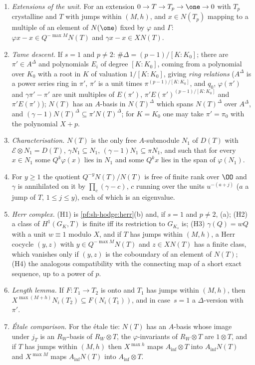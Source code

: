 \begin{enumerate}
  $\shhodgecl(y,z)\in\shhodgeHf(G_{K_s},T)$.
\item[(P8)] \emph{Extensions of the unit.} For an extension $0\to T\to T_p\to\one\to0$ with $T_p$ crystalline and $T$ with jumps within $(M,h)$,
  and $x\in N(T_p)$ mapping to a multiple of an element of $N(\one)$ fixed by $\varphi$ and $\Gamma$: $\varphi x-x\in Q^{-\max M}N(T)$ and
  $\gamma x-x\in XN(T)$.
\item[(P9)] \emph{Tame descent.} If $s=1$ and $p\ne2$: $\#\Delta=(p-1)/[K:K_0]$; there are $\pi'\in A^\Delta$ and polynomials $E_i$ of degree
  $[K:K_0]$, coming from a polynomial over $K_0$ with a root in $K$ of valuation $1/[K:K_0]$, giving \emph{ring relations} ($A^\Delta$ is a
  power series ring in $\pi'$, $\pi'$ is a unit times $\pi^{(p-1)/[K:K_0]}$, and $q_0$, $\varphi(\pi')$ and $\gamma\pi'-\pi'$ are unit multiples of
  $E(\pi')$, $\pi'E(\pi')^{(p-1)/[K:K_0]}$ and $\pi'E(\pi')$); $N(T)$ has an $A$-basis in $N(T)^\Delta$ which spans $N(T)^\Delta$ over $A^\Delta$,
  and $(\gamma-1)N(T)^\Delta\subseteq\pi'N(T)^\Delta$; for $K=K_0$ one may take $\pi'=\pi_0$ with the polynomial $X+p$.
\item[(P10)] \emph{Characterisation.} $N(T)$ is the only free $A$-submodule $N_1$ of $D(T)$ with $\mathcal E\otimes N_1=D(T)$,
  $\gamma N_1\subseteq N_1$, $(\gamma-1)N_1\subseteq\pi N_1$, and such that for every $x\in N_1$ some $Q^k\varphi(x)$ lies in $N_1$ and some
  $Q^kx$ lies in the span of $\varphi(N_1)$.
\item[($\Gamma$ss)] For $y\ge1$ the quotient $Q^{-y}N(T)/N(T)$ is free of finite rank over $\OO$ and $\gamma$ is annihilated on it by
  $\prod_c(\gamma-c)$, $c$ running over the units $u^{-(a+j)}$ ($a$ a jump of $T$, $1\le j\le y$), each of which is an eigenvalue.
\item[(H1)--(H4)] \emph{Herr complex.} (H1) is \cref{pf:sh-hodge:herr}(b) and, if $s=1$ and $p\ne2$, (a); (H2) a class of $H^1(G_K,T)$ is
  finite iff its restriction to $G_{K_s}$ is; (H3) $\gamma(Q)=wQ$ with a unit $w\equiv1$ modulo $X$, and if $T$ has jumps within $(M,h)$, a Herr
  cocycle $(y,z)$ with $y\in Q^{-\max M}N(T)$ and $z\in XN(T)$ has a finite class, which vanishes only if $(y,z)$ is the coboundary of an element of
  $N(T)$; (H4) the analogous compatibility with the connecting map of a short exact sequence, up to a power of $p$.
\item[(L3)] \emph{Length lemma.} If $F\colon T_1\to T_2$ is onto and $T_1$ has jumps within $(M,h)$, then $X^{\max(M+h)}N_i(T_2)\subseteq
  F(N_i(T_1))$, and in case~$s=1$ a $\Delta$-version with $\pi'$.
\item[(E)] \emph{\'Etale comparison.} For the \'etale tie: $N(T)$ has an $A$-basis whose image under $j_T$ is an $R_W$-basis of $R_W\otimes T$,
  the $\varphi$-invariants of $R_W\otimes T$ are $1\otimes T$, and if $T$ has jumps within $(M,h)$ then $X^{\max h}$ maps $A_{\inf}\otimes T$ into
  $A_{\inf}N(T)$ and $X^{\max M}$ maps $A_{\inf}N(T)$ into $A_{\inf}\otimes T$.
\end{enumerate}
